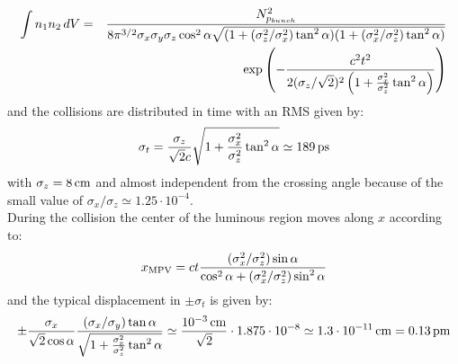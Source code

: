 \documentclass[10pt]{article}
\begin{document}
\begin{eqnarray}
\int n_1n_2\,dV &=&\frac{N^2_{p_{bunch}}}{8\pi^{3/2}\sigma_x\sigma_y\sigma_z\cos^2\alpha\sqrt{(1+(\sigma^2_z/\sigma^2_x)\tan^2\alpha)(1+(\sigma_x^2/\sigma_z^2)\tan^2\alpha)}}\cr
&&\exp\left({-\frac{c^2t^2}{2(\sigma_z/\sqrt{2})^2\left(1+\frac{\sigma^2_x}{\sigma^2_z}\tan^2\alpha\right)}}\right)
\end{eqnarray}
and the collisions are distributed in time with an RMS given by:
\begin{equation}
\sigma_t = \frac{\sigma_z}{\sqrt{2}c}\sqrt{1+\frac{\sigma^2_x}{\sigma^2_z}\tan^2\alpha} \simeq 189\,{\rm ps}
\end{equation}
with $\sigma_z=8\,{\rm cm}$ and almost independent from the crossing angle because of the small value of $\sigma_x/\sigma_z \simeq 1.25\cdot 10^{-4}$. \\
During the collision the center of the luminous region moves along $x$ according to:
\begin{equation}
x_{\rm MPV} = ct\frac{(\sigma_x^2/\sigma_z^2)\sin\alpha}{\cos^2\alpha+(\sigma_x^2/\sigma_z^2)\sin^2\alpha}
\end{equation}
and the typical displacement in $\pm\sigma_t$ is given by:
\begin{equation}
\pm\frac{\sigma_x}{\sqrt{2}\cos\alpha}\frac{(\sigma_x/\sigma_y)\tan\alpha}{\sqrt{1+\frac{\sigma^2_x}{\sigma^2_z}\tan^2\alpha}}\simeq\frac{10^{-3}\,{\rm cm}}{\sqrt{2}}\cdot1.875\cdot 10^{-8} \simeq 1.3\cdot 10^{-11}\,{\rm cm} = 0.13\,{\rm pm}
\end{equation}
%
\end{document}
